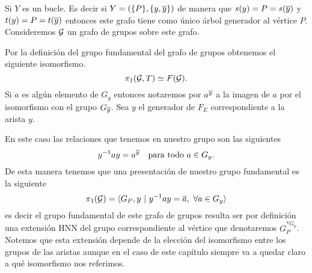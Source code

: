 \documentclass[tesis.tex]{subfiles}
\begin{document}
\begin{ej}\label{ej_pi1_bucle}
	Si $Y$ es un bucle. 
	Es decir si $Y = (\{P\}, \{y,\overline y \})$ de manera que $s(y)=P=s(\overline y)$ y $t(y) = P = t(\overline y)$ entonces este grafo tiene como único árbol generador al vértice $P$.
	Consideremos ${\cal G}$ un grafo de grupos sobre este grafo.
\begin{center}
\end{center}
	
	Por la definición del grupo fundamental del grafo de grupos obtenemos el siguiente isomorfismo. 
	\[
		\pi_1({\cal G},T) \simeq F({\cal G}).
	\]
	Si $a$ es algún elemento de $G_y$ entonces notaremos por $a^{\overline y}$ a la imagen de $a$ por el isomorfismo con el grupo $G_{\overline y}$.
	Sea $y$ el generador de $F_{E}$ correspondiente a la arista $y$.
		 
	En este caso las relaciones que tenemos en nuestro grupo son las siguientes
	\[
	y^{-1}ay = a^{\ol y}  \  \ \ \text{para todo} \ a \in G_y.
	\]   
	De esta manera tenemos que una presentación de nuestro grupo fundamental es la siguiente
	\[
	\pi_1({\cal G}) = \langle G_P, y \ | \ y^{-1}ay = \overline{a}, \ \forall a \in G_y \rangle
	\]
	es decir el grupo fundamental de este grafo de grupos resulta ser por definición una extensión HNN del grupo correspondiente al vértice que denotaremos $G_P^{\ast G_y}$.
	Notemos que esta extensión depende de la elección del isomorfismo entre los grupos de las aristas aunque en el caso de este capítulo siempre va a quedar claro a qué isomorfismo nos referimos.
	
\end{ej}
\end{document}

